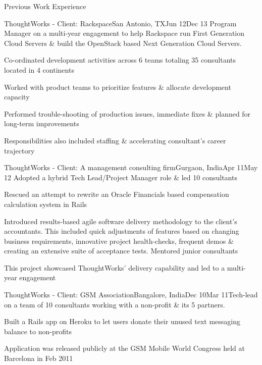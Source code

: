 \documentclass{resume} %
\begin{document}
\begin{rSection}{Previous Work Experience}
\begin{rSubsection}{ThoughtWorks - Client: Rackspace}{San Antonio, TX}{Jun
    12}{Dec 13}
{Program Manager on a multi-year engagement to help Rackspace run
  First Generation Cloud Servers \& build the OpenStack based Next
  Generation Cloud Servers.}

\item Co-ordinated development activities across 6 teams
  totaling 35 consultants located in 4 continents
\item Worked with product teams to prioritize features \& allocate development capacity
\item Performed trouble-shooting of production issues, immediate fixes \& planned for long-term improvements
\item Responsibilities also included staffing \& accelerating consultant's career trajectory
\end{rSubsection}


\begin{rSubsection}{ThoughtWorks - Client: A management consulting
    firm}{Gurgaon, India}{Apr 11}{May 12}
  {Adopted a hybrid Tech Lead/Project Manager role \& led 10 consultants}

\item Rescued an attempt to rewrite an Oracle Financials based compensation calculation system in Rails
\item Introduced results-based agile software delivery
  methodology to the client's accountants. This included quick
  adjustments of features based on changing business requirements, innovative
  project health-checks, frequent demos \& creating an extensive suite
  of acceptance tests. Mentored junior consultants
\item This project showcased ThoughtWorks' delivery capability and led to a multi-year engagement

\end{rSubsection}


\begin{rSubsection}{ThoughtWorks - Client: GSM Association}{Bangalore, India}{Dec 10}{Mar 11}{Tech-lead on a team of 10 consultants working with a non-profit
  \& its 5 partners. }
\item Built a Rails app on Heroku to let users donate their unused text messaging balance to non-profits
\item Application was released publicly at the GSM Mobile World Congress held at Barcelona in Feb 2011
\end{rSubsection}



\end{rSection}
\end{document}
